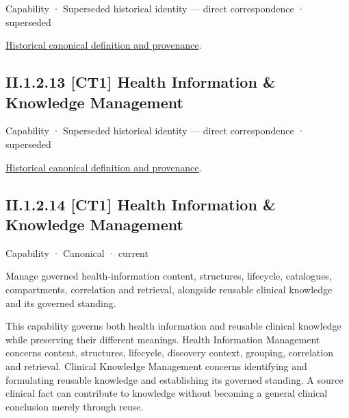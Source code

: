 \label{element:e003b9cd0730459a84775d2837d1d173}
{\small Capability · Superseded historical identity — direct correspondence · superseded}\par
\href{../../../../continuum/strategy/capability/e003b9cd0730459a84775d2837d1d173.md}{Historical canonical definition and provenance}.\par
\subsection*{II.1.2.13 [CT1] Health Information \& Knowledge Management}
\label{navigation:II.1.2.13}

\label{element:a1c557bd263047d0b3ff566cf50b98c1}
{\small Capability · Superseded historical identity — direct correspondence · superseded}\par
\href{../../../../continuum/strategy/capability/a1c557bd263047d0b3ff566cf50b98c1.md}{Historical canonical definition and provenance}.\par
\subsection*{II.1.2.14 [CT1] Health Information \& Knowledge Management}
\label{navigation:II.1.2.14}

\label{element:cca5d5abec204b339eb5b9bd924ed64e}
{\small Capability · Canonical · current}\par

Manage governed health-information content, structures, lifecycle, catalogues, compartments, correlation and retrieval, alongside reusable clinical knowledge and its governed standing.



This capability governs both health information and reusable clinical knowledge while preserving their different meanings. Health Information Management concerns content, structures, lifecycle, discovery context, grouping, correlation and retrieval. Clinical Knowledge Management concerns identifying and formulating reusable knowledge and establishing its governed standing. A source clinical fact can contribute to knowledge without becoming a general clinical conclusion merely through reuse.



